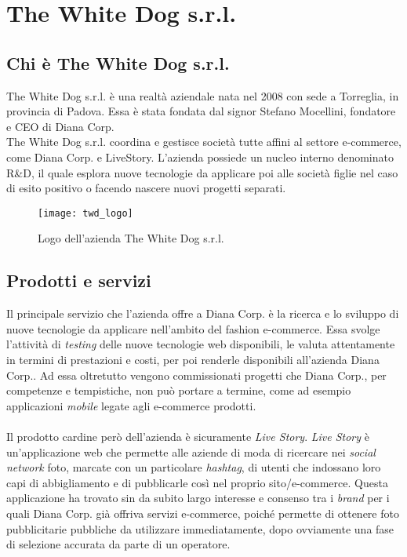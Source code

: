 \newpage
\chapter{The White Dog s.r.l.}
\label{cap:thewhitedog}

\section{Chi è The White Dog s.r.l.}

The White Dog s.r.l. è una realtà aziendale nata nel 2008 con sede a Torreglia, in provincia di Padova. Essa è stata fondata dal signor Stefano Mocellini, fondatore e CEO di Diana Corp. \\
The White Dog s.r.l. coordina e gestisce società tutte affini al settore e-commerce, come Diana Corp. e LiveStory. L'azienda possiede un nucleo interno denominato R\&D, il quale esplora nuove tecnologie da applicare poi alle società figlie nel caso di esito positivo o facendo nascere nuovi progetti separati.

\label{The White Dog s.r.l.}
\begin{figure}[ht]
	\begin{center}
		\texttt{[image: twd\_logo]}
		\caption{Logo dell'azienda The White Dog s.r.l.}
	\end{center}
\end{figure}
\FloatBarrier

\section{Prodotti e servizi}

Il principale servizio che l'azienda offre a Diana Corp. è la ricerca e lo sviluppo di nuove tecnologie da applicare nell'ambito del fashion e-commerce. Essa svolge l'attività di \textit{testing} delle nuove tecnologie web disponibili, le valuta attentamente in termini di prestazioni e costi, per poi renderle disponibili all'azienda Diana Corp.. Ad essa oltretutto vengono commissionati progetti che Diana Corp., per competenze e tempistiche, non può portare a termine, come ad esempio applicazioni \textit{mobile} legate agli e-commerce prodotti. \\ \\
Il prodotto cardine però dell'azienda è sicuramente \textit{Live Story}. \textit{Live Story} è un'applicazione web che permette alle aziende di moda di ricercare nei \textit{social network} foto, marcate con un particolare \textit{hashtag}, di utenti che indossano loro capi di abbigliamento e di pubblicarle così nel proprio sito/e-commerce. Questa applicazione ha trovato sin da subito largo interesse e consenso tra i \textit{brand} per i quali Diana Corp. già offriva servizi e-commerce, poiché permette di ottenere foto pubblicitarie pubbliche da utilizzare immediatamente, dopo ovviamente una fase di selezione accurata da parte di un operatore.

